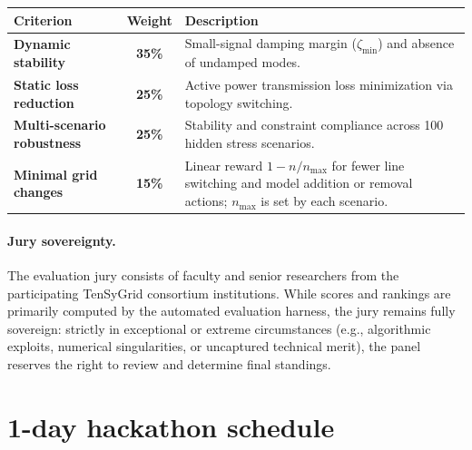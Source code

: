 \documentclass[11pt,a4paper]{article}
\begin{document}
\begin{table}[H]
  \centering
  \small
  \begin{tabularx}{\textwidth}{lcX}
    \toprule
    \textbf{\color{tgblue}Criterion}   & \textbf{\color{tgblue}Weight} & \textbf{\color{tgblue}Description}                                                                                               \\
    \midrule
    \textbf{Dynamic stability}         & \textbf{35\%}                 & Small-signal damping margin ($\zeta_{\min}$) and absence of undamped modes.                                                      \\
    \textbf{Static loss reduction}     & \textbf{25\%}                 & Active power transmission loss minimization via topology switching.                                                              \\
    \textbf{Multi-scenario robustness} & \textbf{25\%}                 & Stability and constraint compliance across 100 hidden stress scenarios.                                                          \\
    \textbf{Minimal grid changes}      & \textbf{15\%}                 & Linear reward $1-n/n_{\max}$ for fewer line switching and model addition or removal actions; $n_{\max}$ is set by each scenario. \\
    \bottomrule
  \end{tabularx}
\end{table}

\paragraph{Jury sovereignty.}
The evaluation jury consists of faculty and senior researchers from the participating TenSyGrid consortium institutions. While scores and rankings are primarily computed by the automated evaluation harness, the jury remains fully sovereign: strictly in exceptional or extreme circumstances (e.g., algorithmic exploits, numerical singularities, or uncaptured technical merit), the panel reserves the right to review and determine final standings.

\section{1-day hackathon schedule}
\end{document}
